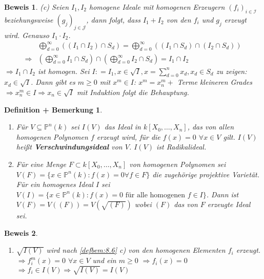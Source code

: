 \documentclass[a4paper,12pt]{report}
\theoremstyle{break}
\newtheorem{DefBem}[Def]{Definition + Bemerkung}
\theoremstyle{nonumberbreak}
\theoremstyle{nonumberplain}
\newtheorem{Bew}{Beweis}
\newcommand{\emp}[1]{\textbf{\emph{#1}}}
\newcommand{\begriff}[1]{{\index{#1}}\emp{#1}}
\newcommand{\defeqr}[0]{\mathrel{\mathop:}=}
\begin{document}
\begin{Bew}
  (c) Seien $I_1,I_2$ homogene Ideale mit homogenen Erzeugern $(f_i)_{i\in \mathcal I}$ beziehungsweise
    $(g_j)_{j\in \mathcal J}$, dann folgt, dass $I_1+I_2$ von den $f_i$ und $g_j$ erzeugt wird. Genauso $I_1\cdot I_2$. \\
    \begin{align*}
      & \bigoplus_{d=0}^\infty((I_1\cap I_2)\cap S_d)=\bigoplus_{d=0}^\infty((I_1\cap S_d)\cap (I_2\cap S_d)) \\
      \Rightarrow & \left(\bigoplus_{d=0}^\infty I_1\cap S_d\right)\cap \left(\bigoplus_{d=0}^\infty I_2\cap S_d\right)=I_1\cap I_2
    \end{align*}
    $\Rightarrow I_1\cap I_2$ ist homogen.
    Sei $I\defeqr I_1, x\in\sqrt{I},x=\sum_{d=0}^nx_d,x_d\in S_d$ zu zeigen: $x_d\in\sqrt{I}$.
    Dann gibt es $m\geq 0$ mit $x^m\in I$: $x^m=x_n^m+$ Terme kleineren Grades \\
    $\Rightarrow x_n^m\in I \Rightarrow x_n\in\sqrt{I}$ mit Induktion folgt die Behauptung.
 \end{Bew}
\begin{DefBem}
 \begin{enumerate}
  \item Für $V \subseteq \mathbb P^n(k)$ sei $I(V)$ das Ideal in $k[X_0,\dots,X_n]$, das von allen homogenen Polynomen $f$ erzeugt wird, für die $f(x)=0 $ $\forall x \in V$ gilt. $I(V)$ heißt \begriff{Verschwindungsideal} von $V$. $I(V)$ ist Radikalideal.
  \item Für eine Menge $F \subset k[X_0,\dots,X_n]$ von homogenen Polynomen sei $V(F)=\{ x \in \mathbb P^n(k):f(x)=0 \forall f \in F \}$ die zugehörige projektive Varietät. \\ 
  Für ein homogenes Ideal $I$ sei $V(I)=\{ x \in \mathbb P^n(k):f(x)=0  \text{ für alle homogenen } f \in I \} $. Dann ist $V(F)=V((F))=V(\sqrt{(F)})$ wobei $(F)$ das von $F$ erzeugte Ideal sei.
 \end{enumerate}
\end{DefBem}
\begin{Bew}
 \begin{enumerate}
  \item $\sqrt{I(V)}$ wird nach \ref{defbem:8.6} c) von den homogenen Elementen $f_i$ erzeugt.\\
	$\Rightarrow f_i^m(x) = 0$ $\forall x \in V$ und ein $m \ge 0$ $\Rightarrow f_i(x)=0$ $\Rightarrow f_i \in I(V) \Rightarrow \sqrt{I(V)} = I(V)$
 \end{enumerate}
\end{Bew}
\end{document}
